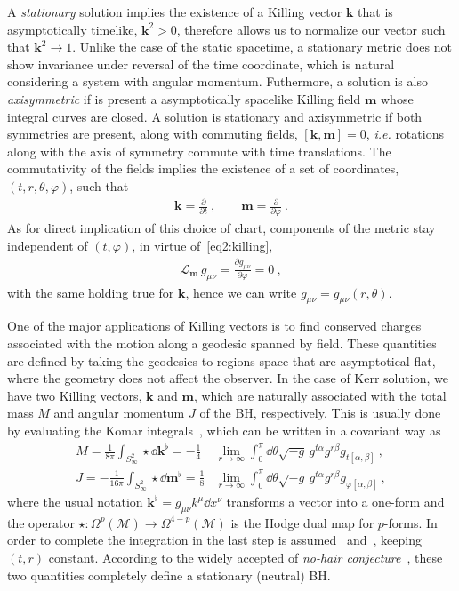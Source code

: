 A \emph{stationary} solution implies the existence of a Killing vector $\bm{k}$ that is asymptotically timelike, $\bm{k}^2>0$, therefore allows us to normalize our vector such that $\bm{k}^2 \rightarrow 1$. 
Unlike the case of the static spacetime, a stationary metric does not show invariance under reversal of the time coordinate, which is natural considering a system with angular momentum. 
Futhermore, a solution is also \emph{axisymmetric} if is present a asymptotically spacelike Killing field $\bm{m}$ whose integral curves are closed.
A solution is stationary and axisymmetric if both symmetries are present, along with commuting fields, $[\bm{k} , \bm{m}] = 0$, \emph{i.e.} rotations along with the axis of symmetry commute with time translations. The commutativity of the fields implies the existence of a set of coordinates, $(t,r,\theta,\varphi)$, such that
\begin{align}
    \bm{k} = \frac{\partial}{\partial t} ~, \qquad \bm{m} = \frac{\partial}{\partial \varphi} ~.
    \label{eq2:tPhiKilling}
\end{align}
As for direct implication of this choice of chart, components of the metric stay independent of $(t,\varphi)$, in virtue of~\eqref{eq2:killing},
\begin{align}
    \mathscr{L}_{\bm{m}} \,g_{\mu\nu} = \frac{\partial g_{\mu\nu}}{\partial \varphi} = 0 ~,
    \label{eq2:lieMetricTPhi}
\end{align}
with the same holding true for $\bm{k}$, hence we can write $g_{\mu\nu} = g_{\mu\nu}(r,\theta)$. 

One of the major applications of Killing vectors is to find conserved charges associated with the motion along a geodesic spanned by field.
These quantities are defined by taking the geodesics to regions space that are asymptotical flat, where the geometry does not affect the observer.
In the case of Kerr solution, we have two Killing vectors, $\bm{k}$ and $\bm{m}$, which are naturally associated with the total mass $M$ and angular momentum $J$ of the BH, respectively.
This is usually done by evaluating the Komar integrals~\cite{Heusler1996, Wald2010}, which can be written in a covariant way as
\begin{align}
    M = \frac{1}{8 \pi} \int_{S^2_\infty} \star \dd \bm{k}^\flat  =  -\frac{1}{4}& \lim_{r\to\infty}  \int_0^\pi \dd\theta \sqrt{-g} \, g^{t\alpha} g^{r\beta} g_{t[\alpha,\beta]} ~, \label{eq2:komarMass} \\
    J = -\frac{1}{16 \pi} \int_{S^2_\infty} \star \dd \bm{m}^\flat = \frac{1}{8}& \lim_{r\to\infty}  \int_0^\pi \dd\theta \sqrt{-g} \, g^{t\alpha} g^{r\beta} g_{\varphi[\alpha,\beta]} ~, \label{eq2:komarSpin}
\end{align}
where the usual notation $\bm{k}^\flat = g_{\mu\nu} k^\mu \dd x^\nu$ transforms a vector into a one-form and the operator $\star : \Omega^{p}(\mathscr{M})\to\Omega^{4-p}(\mathscr{M})$ is the Hodge dual map for $p$-forms.
In order to complete the integration in the last step is assumed~ and~, keeping $(t,r)$ constant. 
According to the widely accepted of \emph{no-hair conjecture}~\cite{Carter1971}, these two quantities completely define a stationary (neutral) BH. 

